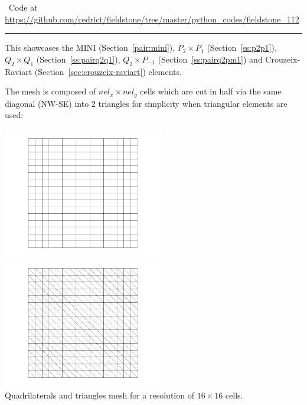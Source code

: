 

\begin{center}
\inpython~Code at \url{https://github.com/cedrict/fieldstone/tree/master/python_codes/fieldstone_112}
\end{center}

\par\noindent\rule{\textwidth}{0.4pt}


This \stone showcases the MINI (Section~\ref{pair:mini}), 
$P_2\times P_1$ (Section~\ref{ss:p2p1}), $Q_2\times Q_1$ (Section~\ref{ss:pairq2q1}), 
$Q_2\times P_{-1}$ (Section~\ref{ss:pairq2pm1}) and Crouzeix-Raviart  (Section~\ref{sec:crouzeix-raviart})
elements.

The mesh is composed of $nel_x \times nel_y$ cells which are cut in half via the same 
diagonal (NW-SE) into 2 triangles for simplicity when triangular elements are used: 

\begin{center}
\includegraphics[width=7cm]{python_codes/fieldstone_112/results/exp1/grid_quads}
\includegraphics[width=7cm]{python_codes/fieldstone_112/results/exp1/grid_triangles}\\
{\captionfont Quadrilaterals and triangles mesh for a resolution of $16\times 16$ cells.} 
\end{center}

